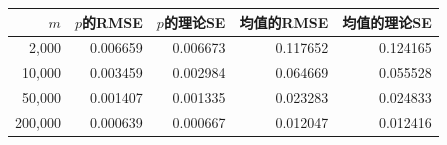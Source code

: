 \begin{tabular}{rrrrr}
\toprule
$m$ & $p$的RMSE & $p$的理论SE & 均值的RMSE & 均值的理论SE \\
\midrule
2,000 & 0.006659 & 0.006673 & 0.117652 & 0.124165 \\
10,000 & 0.003459 & 0.002984 & 0.064669 & 0.055528 \\
50,000 & 0.001407 & 0.001335 & 0.023283 & 0.024833 \\
200,000 & 0.000639 & 0.000667 & 0.012047 & 0.012416 \\
\bottomrule
\end{tabular}
